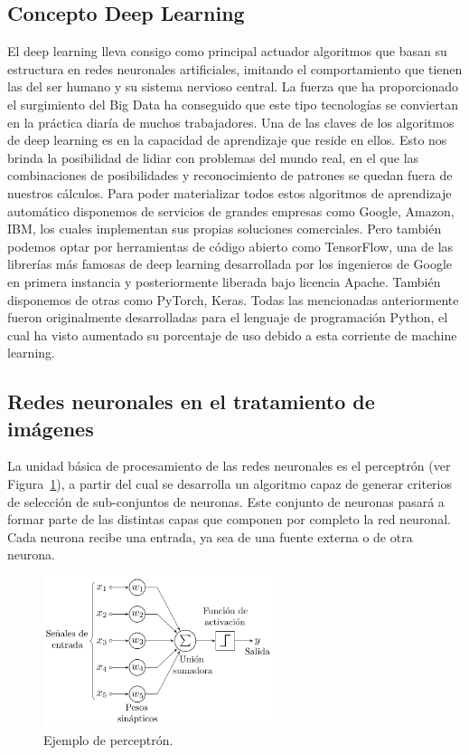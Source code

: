 \subsection{Concepto Deep Learning}\label{subsec:concepto-deep-learning}
El deep learning lleva consigo como principal actuador algoritmos que basan su estructura en redes neuronales artificiales, imitando el comportamiento que tienen las del ser humano y su sistema nervioso central.
La fuerza que ha proporcionado el surgimiento del Big Data ha conseguido que este tipo tecnologías se conviertan en la práctica diaría de muchos trabajadores.
Una de las claves de los algoritmos de deep learning es en la capacidad de aprendizaje que reside en ellos.
Esto nos brinda la posibilidad de lidiar con problemas del mundo real,
en el que las combinaciones de posibilidades y reconocimiento de patrones se quedan fuera de nuestros cálculos.
Para poder materializar todos estos algoritmos de aprendizaje automático disponemos de servicios de grandes empresas como Google, Amazon, IBM, los cuales
implementan sus propias soluciones comerciales.
Pero también podemos optar por herramientas de código abierto como TensorFlow, una de las librerías más famosas de deep learning desarrollada por los ingenieros de Google en primera instancia y posteriormente liberada bajo licencia Apache.
También disponemos de otras como PyTorch, Keras.
Todas las mencionadas anteriormente fueron originalmente desarrolladas para el lenguaje de programación Python, el cual ha visto aumentado su porcentaje de uso debido a esta corriente de
machine learning.

\subsection{Redes neuronales en el tratamiento de imágenes}\label{subsec:redes-neuronales-en-el-tratamiento-de-imágenes}
La unidad básica de procesamiento de las redes neuronales es el perceptrón (ver Figura~\ref{fig:Perceptrón}),
a partir del cual se desarrolla un algoritmo capaz de generar criterios de selección de sub-conjuntos de neuronas.
Este conjunto de neuronas pasará a formar parte de las distintas capas que componen por completo la red neuronal.
Cada neurona recibe una entrada, ya sea de una fuente externa o de otra neurona.

\begin{figure}[H]
    \centering
    \includegraphics[width=0.6\textwidth]{images/chapter1/perceptron.png}
    \caption{Ejemplo de perceptrón.}
    \label{fig:Perceptrón}
\end{figure}

